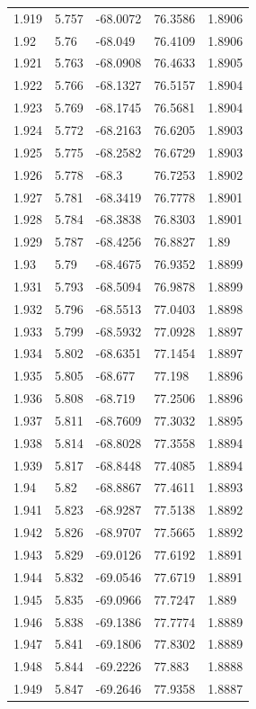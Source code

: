 \begin{tabular}{lllll}
1.919 & 5.757 & -68.0072 & 76.3586 & 1.8906 \\
1.92 & 5.76 & -68.049 & 76.4109 & 1.8906 \\
1.921 & 5.763 & -68.0908 & 76.4633 & 1.8905 \\
1.922 & 5.766 & -68.1327 & 76.5157 & 1.8904 \\
1.923 & 5.769 & -68.1745 & 76.5681 & 1.8904 \\
1.924 & 5.772 & -68.2163 & 76.6205 & 1.8903 \\
1.925 & 5.775 & -68.2582 & 76.6729 & 1.8903 \\
1.926 & 5.778 & -68.3 & 76.7253 & 1.8902 \\
1.927 & 5.781 & -68.3419 & 76.7778 & 1.8901 \\
1.928 & 5.784 & -68.3838 & 76.8303 & 1.8901 \\
1.929 & 5.787 & -68.4256 & 76.8827 & 1.89 \\
1.93 & 5.79 & -68.4675 & 76.9352 & 1.8899 \\
1.931 & 5.793 & -68.5094 & 76.9878 & 1.8899 \\
1.932 & 5.796 & -68.5513 & 77.0403 & 1.8898 \\
1.933 & 5.799 & -68.5932 & 77.0928 & 1.8897 \\
1.934 & 5.802 & -68.6351 & 77.1454 & 1.8897 \\
1.935 & 5.805 & -68.677 & 77.198 & 1.8896 \\
1.936 & 5.808 & -68.719 & 77.2506 & 1.8896 \\
1.937 & 5.811 & -68.7609 & 77.3032 & 1.8895 \\
1.938 & 5.814 & -68.8028 & 77.3558 & 1.8894 \\
1.939 & 5.817 & -68.8448 & 77.4085 & 1.8894 \\
1.94 & 5.82 & -68.8867 & 77.4611 & 1.8893 \\
1.941 & 5.823 & -68.9287 & 77.5138 & 1.8892 \\
1.942 & 5.826 & -68.9707 & 77.5665 & 1.8892 \\
1.943 & 5.829 & -69.0126 & 77.6192 & 1.8891 \\
1.944 & 5.832 & -69.0546 & 77.6719 & 1.8891 \\
1.945 & 5.835 & -69.0966 & 77.7247 & 1.889 \\
1.946 & 5.838 & -69.1386 & 77.7774 & 1.8889 \\
1.947 & 5.841 & -69.1806 & 77.8302 & 1.8889 \\
1.948 & 5.844 & -69.2226 & 77.883 & 1.8888 \\
1.949 & 5.847 & -69.2646 & 77.9358 & 1.8887 \\

\end{tabular}
